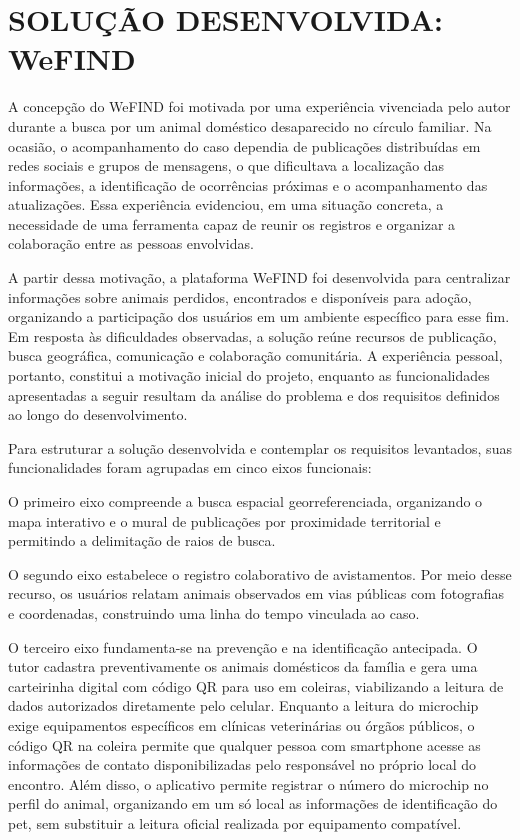 \section{SOLUÇÃO DESENVOLVIDA: WeFIND}

A concepção do WeFIND foi motivada por uma experiência vivenciada pelo autor durante a busca por um animal doméstico desaparecido no círculo familiar. Na ocasião, o acompanhamento do caso dependia de publicações distribuídas em redes sociais e grupos de mensagens, o que dificultava a localização das informações, a identificação de ocorrências próximas e o acompanhamento das atualizações. Essa experiência evidenciou, em uma situação concreta, a necessidade de uma ferramenta capaz de reunir os registros e organizar a colaboração entre as pessoas envolvidas.

A partir dessa motivação, a plataforma WeFIND foi desenvolvida para centralizar informações sobre animais perdidos, encontrados e disponíveis para adoção, organizando a participação dos usuários em um ambiente específico para esse fim. Em resposta às dificuldades observadas, a solução reúne recursos de publicação, busca geográfica, comunicação e colaboração comunitária. A experiência pessoal, portanto, constitui a motivação inicial do projeto, enquanto as funcionalidades apresentadas a seguir resultam da análise do problema e dos requisitos definidos ao longo do desenvolvimento.

Para estruturar a solução desenvolvida e contemplar os requisitos levantados, suas funcionalidades foram agrupadas em cinco eixos funcionais:

O primeiro eixo compreende a busca espacial georreferenciada, organizando o mapa interativo e o mural de publicações por proximidade territorial e permitindo a delimitação de raios de busca.

O segundo eixo estabelece o registro colaborativo de avistamentos. Por meio desse recurso, os usuários relatam animais observados em vias públicas com fotografias e coordenadas, construindo uma linha do tempo vinculada ao caso.

O terceiro eixo fundamenta-se na prevenção e na identificação antecipada. O tutor cadastra preventivamente os animais domésticos da família e gera uma carteirinha digital com código QR para uso em coleiras, viabilizando a leitura de dados autorizados diretamente pelo celular. Enquanto a leitura do microchip exige equipamentos específicos em clínicas veterinárias ou órgãos públicos, o código QR na coleira permite que qualquer pessoa com smartphone acesse as informações de contato disponibilizadas pelo responsável no próprio local do encontro. Além disso, o aplicativo permite registrar o número do microchip no perfil do animal, organizando em um só local as informações de identificação do pet, sem substituir a leitura oficial realizada por equipamento compatível.

